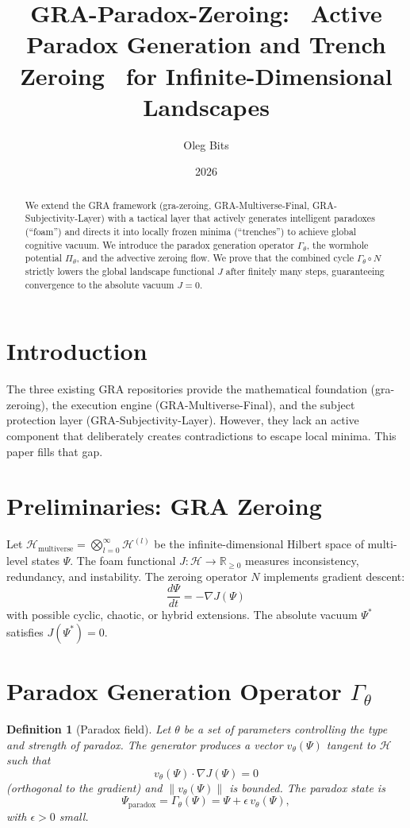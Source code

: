 \documentclass[12pt]{article}
\title{GRA-Paradox-Zeroing: \ Active Paradox Generation and Trench Zeroing \ for Infinite-Dimensional Landscapes}
\author{Oleg Bits}
\date{2026}
\newtheorem{definition}[theorem]{Definition}
\begin{document}
\maketitle

\begin{abstract}
We extend the GRA framework (gra-zeroing, GRA-Multiverse-Final, GRA-Subjectivity-Layer) with a tactical layer that actively generates intelligent paradoxes (``foam'') and directs it into locally frozen minima (``trenches'') to achieve global cognitive vacuum. We introduce the paradox generation operator $\Gamma_\theta$, the wormhole potential $\Pi_\theta$, and the advective zeroing flow. We prove that the combined cycle $\Gamma_\theta \circ N$ strictly lowers the global landscape functional $J$ after finitely many steps, guaranteeing convergence to the absolute vacuum $J=0$.
\end{abstract}

\section{Introduction}
The three existing GRA repositories provide the mathematical foundation (gra-zeroing), the execution engine (GRA-Multiverse-Final), and the subject protection layer (GRA-Subjectivity-Layer). However, they lack an active component that deliberately creates contradictions to escape local minima. This paper fills that gap.

\section{Preliminaries: GRA Zeroing}
Let $\mathcal{H}_{\text{multiverse}} = \bigotimes_{l=0}^\infty \mathcal{H}^{(l)}$ be the infinite-dimensional Hilbert space of multi-level states $\Psi$. The foam functional $J: \mathcal{H} \to \mathbb{R}_{\ge 0}$ measures inconsistency, redundancy, and instability. The zeroing operator $N$ implements gradient descent:
\[
\frac{d\Psi}{dt} = -\nabla J(\Psi)
\]
with possible cyclic, chaotic, or hybrid extensions. The absolute vacuum $\Psi^*$ satisfies $J(\Psi^*) = 0$.

\section{Paradox Generation Operator $\Gamma_\theta$}
\begin{definition}[Paradox field]
Let $\theta$ be a set of parameters controlling the type and strength of paradox. The generator produces a vector $v_\theta(\Psi)$ tangent to $\mathcal{H}$ such that
\[
v_\theta(\Psi) \cdot \nabla J(\Psi) = 0
\]
(orthogonal to the gradient) and $\|v_\theta(\Psi)\|$ is bounded. The paradox state is
\[
\Psi_{\text{paradox}} = \Gamma_\theta(\Psi) = \Psi + \epsilon\, v_\theta(\Psi),
\]
with $\epsilon > 0$ small.
\end{definition}
\end{document}
